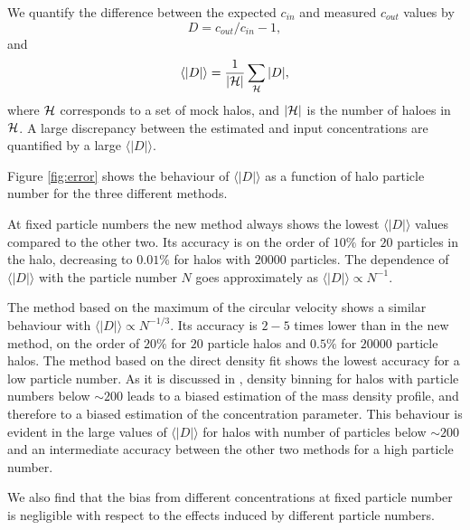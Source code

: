 \documentclass{emulateapj}
\newcommand{\avg}[1]{\langle{#1}\rangle}
\begin{document}
We quantify the difference between the expected $c_{in}$ and measured
$c_{out}$ values by
%
\begin{equation}
D= c_{out}/c_{in}-1,
\label{eq:D}
\end{equation}
%
and
%
\begin{equation}
\avg{|D|}=\frac{1}{\left|{\cal{H}}\right|}\sum_{{\cal{H}}} |D|,
\end{equation}
%
where ${\cal{H}}$ corresponds to a set of mock halos, and
$\left|{\cal{H}}\right|$ is the number of haloes in ${\cal{H}}$.  A
large discrepancy between the estimated and input concentrations are
quantified by a large $\avg{|D|}$.


Figure \ref{fig:error} shows the behaviour of $\avg{|D|}$ as a
function of halo particle number for the three different methods.

At fixed particle numbers the new method always shows the lowest
$\avg{|D|}$ values compared to the other two.  Its accuracy is on the
order of $10\%$ for $20$ particles in the halo, decreasing to $0.01\%$
for halos with $20000$ particles.  The dependence of $\avg{|D|}$ with
the particle number $N$ goes approximately as $\avg{|D|}\propto
N^{-1}$.

The method based on the maximum of the circular velocity shows a
similar behaviour with $\avg{|D|}\propto N^{-1/3}$.  Its accuracy is
$2-5$ times lower than in the new method, on the order of $20\%$ for
$20$ particle halos and $0.5\%$ for $20000$ particle halos.  The
method based on the direct density fit shows the lowest accuracy for a
low particle number.  As it is discussed in \citep{Munoz2011}, density
binning for halos with particle numbers below $\sim200$ leads to a
biased estimation of the mass density profile, and therefore to a
biased estimation of the concentration parameter.  This behaviour is
evident in the large values of $\avg{|D|}$ for halos with number of
particles below $\sim 200$ and an intermediate accuracy between the
other two methods for a high particle number.

We also find that the bias from different concentrations at fixed
particle number is negligible with respect to the effects induced by
different particle numbers. 
\end{document}
